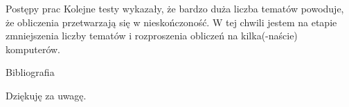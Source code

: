 \documentclass[11pt,pdftex,mathserif]{beamer}\usepackage[]{graphicx}\usepackage[]{color}
\theoremstyle{definition}
\begin{document}
\begin{frame}{Postępy prac}
Kolejne testy wykazały, że bardzo duża liczba tematów powoduje, że obliczenia przetwarzają się w nieskończoność. W tej chwili jestem na etapie zmniejszenia liczby tematów i rozproszenia obliczeń na kilka(-naście) komputerów.
\end{frame}


\begin{frame}{Bibliografia}
\nocite{Hornik2012:sphkmeans}
\nocite{Wild2002:sphkmeans}
\nocite{Loo2014:stringdist}


\end{frame}


% 
% 
% 
% 

\begin{frame}{}
   \begin{center}
      \Huge{Dziękuję za uwagę.}
   \end{center}
\end{frame}
\end{document}
